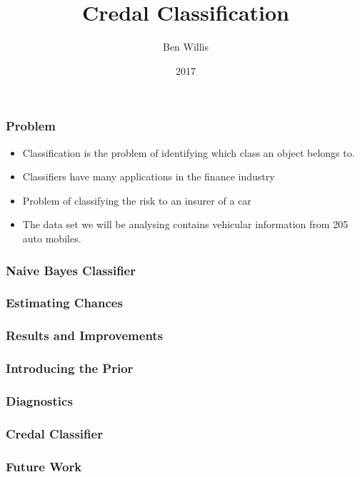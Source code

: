 \documentclass{beamer}
\title{Credal Classification}
\author{Ben Willis}
\institute{Durham University}
\date{2017}
\begin{document}
 
\frame{\titlepage}
\begin{frame}
\frametitle{Problem}
\begin{itemize}
	\item Classification is the problem of identifying which class an object belongs to.
	\item Classifiers have many applications in the finance industry
	\item Problem of classifying the risk to an insurer of a car
	\item The data set we will be analysing contains vehicular information from 205 auto mobiles.
\end{itemize}
\end{frame}

\begin{frame}
\frametitle{Naive Bayes Classifier}
\end{frame}

\begin{frame}
\frametitle{Estimating Chances}
\end{frame}

\begin{frame}
\frametitle{Results and Improvements}
\end{frame}

\begin{frame}
\frametitle{Introducing the Prior}
\end{frame}

\begin{frame}
\frametitle{Diagnostics}
\end{frame}

\begin{frame}
\frametitle{Credal Classifier}
\end{frame}

\begin{frame}
\frametitle{Future Work}
\end{frame}
 
\end{document}

